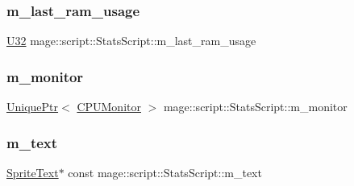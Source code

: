 \hypertarget{classmage_1_1script_1_1_stats_script_a0ea0dcf90e4364af1f64d67024314a94}{}\label{classmage_1_1script_1_1_stats_script_a0ea0dcf90e4364af1f64d67024314a94} 
\subsubsection{\texorpdfstring{m\+\_\+last\+\_\+ram\+\_\+usage}{m\_last\_ram\_usage}}
{\footnotesize\ttfamily \hyperlink{namespacemage_a41c104c036fba3756a74e19f793eeaa1}{U32} mage\+::script\+::\+Stats\+Script\+::m\+\_\+last\+\_\+ram\+\_\+usage\hspace{0.3cm}{\ttfamily [private]}}

\hypertarget{classmage_1_1script_1_1_stats_script_a400a588c3e8c65344af131324f7d3f54}{}\label{classmage_1_1script_1_1_stats_script_a400a588c3e8c65344af131324f7d3f54} 
\subsubsection{\texorpdfstring{m\+\_\+monitor}{m\_monitor}}
{\footnotesize\ttfamily \hyperlink{namespacemage_a3316d7143a973e37adf1110f2e80ca31}{Unique\+Ptr}$<$ \hyperlink{classmage_1_1_c_p_u_monitor}{C\+P\+U\+Monitor} $>$ mage\+::script\+::\+Stats\+Script\+::m\+\_\+monitor\hspace{0.3cm}{\ttfamily [private]}}

\hypertarget{classmage_1_1script_1_1_stats_script_a684581902f697b5503b8a86344062600}{}\label{classmage_1_1script_1_1_stats_script_a684581902f697b5503b8a86344062600} 
\subsubsection{\texorpdfstring{m\+\_\+text}{m\_text}}
{\footnotesize\ttfamily \hyperlink{classmage_1_1_sprite_text}{Sprite\+Text}$\ast$ const mage\+::script\+::\+Stats\+Script\+::m\+\_\+text\hspace{0.3cm}{\ttfamily [private]}}

